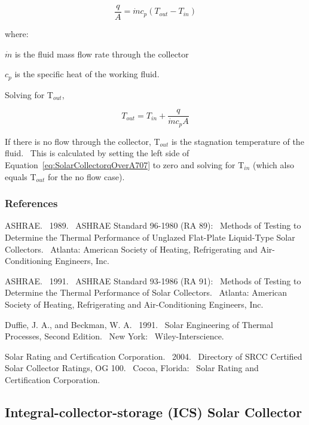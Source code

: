 \begin{equation}
\frac{q}{A} = \dot m{c_p}({T_{out}} - {T_{in}})
\end{equation}

where:

\(\dot m\) is the fluid mass flow rate through the collector

\(c_{p}\) is the specific heat of the working fluid.

Solving for T\(_{out}\),

\begin{equation}
{T_{out}} = {T_{in}} + \frac{q}{{\dot m{c_p}A}}
\end{equation}

If there is no flow through the collector, T\(_{out}\) is the stagnation temperature of the fluid.~ This is calculated by setting the left side of Equation~\ref{eq:SolarCollectorqOverA707} to zero and solving for T\(_{in}\) (which also equals T\(_{out}\) for the no flow case).

\subsubsection{References}\label{references-042}

ASHRAE.~ 1989.~ ASHRAE Standard 96-1980 (RA 89):~ Methods of Testing to Determine the Thermal Performance of Unglazed Flat-Plate Liquid-Type Solar Collectors.~ Atlanta: American Society of Heating, Refrigerating and Air-Conditioning Engineers, Inc.

ASHRAE.~ 1991.~ ASHRAE Standard 93-1986 (RA 91):~ Methods of Testing to Determine the Thermal Performance of Solar Collectors.~ Atlanta: American Society of Heating, Refrigerating and Air-Conditioning Engineers, Inc.

Duffie, J. A., and Beckman, W. A.~ 1991.~ Solar Engineering of Thermal Processes, Second Edition.~ New York:~ Wiley-Interscience.

Solar Rating and Certification Corporation.~ 2004.~ Directory of SRCC Certified Solar Collector Ratings, OG 100.~ Cocoa, Florida:~ Solar Rating and Certification Corporation.

\subsection{Integral-collector-storage (ICS) Solar Collector}\label{integral-collector-storage-ics-solar-collector}

